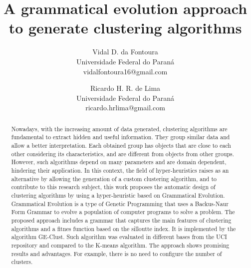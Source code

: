 \documentclass[conference,compsoc]{IEEEtran}
\begin{document}
	
\title{A grammatical evolution approach to generate clustering algorithms}


\author{
Vidal D. da Fontoura\\
Universidade Federal do Paraná\\
vidalfontoura16@gmail.com
\and
Ricardo H. R. de Lima\\
Universidade Federal do Paraná\\
ricardo.hrlima@gmail.com
}


\maketitle

\begin{abstract}
	
	
	Nowadays, with the increasing amount of data generated, clustering algorithms are fundamental to extract hidden and useful information. They group similar data and allow a better interpretation. Each obtained group has objects that are close to each other considering its characteristics, and are different from objects from other groups. However, such algorithms depend on many parameters and are domain dependent, hindering their application. In this context, the field of hyper-heuristics raises as an alternative by allowing the generation of a custom clustering algorithm, and to contribute to this research subject, this work proposes the automatic design of clustering algorithms by using a hyper-heuristic based on Grammatical Evolution. Grammatical Evolution is a type of Genetic Programming that uses a Backus-Naur Form Grammar to evolve a population of computer programs to solve a problem. The proposed approach includes a grammar that captures the main features of clustering algorithms and a fitnes function based on the silloutte index. It is implemented by the algorithm GE-Clust. Such algorithm was evaluated in different bases from the UCI repository and compared to the K-means algorithm. The approach  shows promising results  and advantages. For example, there is no need to configure the number of clusters.
	
\end{abstract}


\IEEEpeerreviewmaketitle
\end{document}

